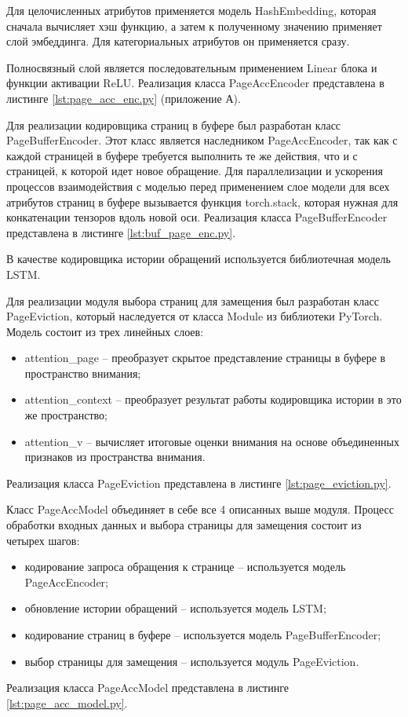 Для целочисленных атрибутов применяется модель HashEmbedding, которая сначала вычисляет хэш функцию, а затем к полученному значению применяет слой эмбеддинга.
Для категориальных атрибутов он применяется сразу.

Полносвязный слой является последовательным применением Linear блока и функции активации ReLU.
Реализация класса PageAccEncoder представлена в листинге \ref{lst:page_acc_enc.py} (приложение А).

Для реализации кодировщика страниц в буфере был разработан класс PageBufferEncoder.
Этот класс является наследником PageAccEncoder, так как с каждой страницей в буфере требуется выполнить те же действия, что и с страницей, к которой идет новое обращение.
Для параллелизации и ускорения процессов взаимодействия с моделью перед применением слое модели для всех атрибутов страниц в буфере вызывается функция torch.stack, которая нужная для конкатенации тензоров вдоль новой оси.
Реализация класса PageBufferEncoder представлена в листинге \ref{lst:buf_page_enc.py}.

В качестве кодировщика истории обращений используется библиотечная модель LSTM.

Для реализации модуля выбора страниц для замещения был разработан класс PageEviction, который наследуется от класса Module из библиотеки PyTorch.
Модель состоит из трех линейных слоев:
\begin{itemize}
	\item attention\_page -- преобразует скрытое представление страницы в буфере в пространство внимания;
	\item attention\_context -- преобразует результат работы кодировщика истории в это же пространство;
	\item attention\_v -- вычисляет итоговые оценки внимания на основе объединенных признаков из пространства внимания.
\end{itemize}
Реализация класса PageEviction представлена в листинге \ref{lst:page_eviction.py}.

Класс PageAccModel объединяет в себе все 4 описанных выше модуля.
Процесс обработки входных данных и выбора страницы для замещения состоит из четырех шагов:
\begin{itemize}
	\item кодирование запроса обращения к странице -- используется модель PageAccEncoder;
	\item обновление истории обращений -- используется модель LSTM;
	\item кодирование страниц в буфере -- используется модель PageBufferEncoder;
	\item выбор страницы для замещения -- используется модуль PageEviction.
\end{itemize}
Реализация класса PageAccModel представлена в листинге \ref{lst:page_acc_model.py}.

